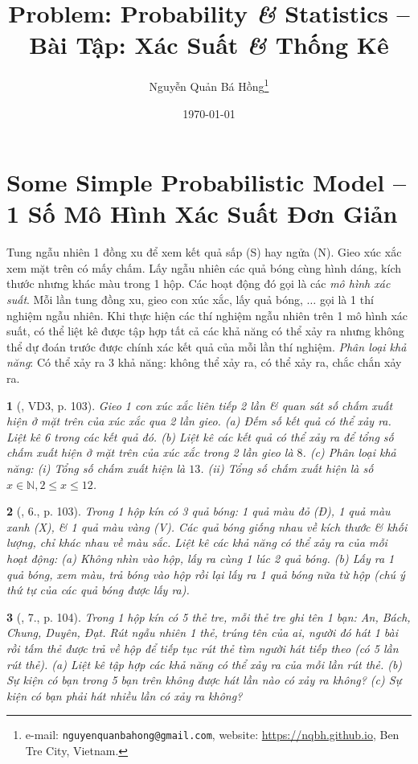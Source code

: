 \documentclass{article}
\title{Problem: Probability {\it\&} Statistics -- Bài Tập: Xác Suất {\it\&} Thống Kê}
\author{Nguyễn Quản Bá Hồng\footnote{e-mail: \texttt{nguyenquanbahong@gmail.com}, website: \url{https://nqbh.github.io}, Ben Tre City, Vietnam.}}
\date{\today}
\newtheorem{baitoan}{}
\begin{document}
\maketitle
\tableofcontents


\section{Some Simple Probabilistic Model -- 1 Số Mô Hình Xác Suất Đơn Giản}
 Tung ngẫu nhiên 1 đồng xu để xem kết quả sấp (S) hay ngửa (N). Gieo xúc xắc xem mặt trên có mấy chấm. Lấy ngẫu nhiên các quả bóng cùng hình dáng, kích thước nhưng khác màu trong 1 hộp. Các hoạt động đó gọi là các \textit{mô hình xác suất}. Mỗi lần tung đồng xu, gieo con xúc xắc, lấy quả bóng, $\ldots$ gọi là 1 thí nghiệm ngẫu nhiên.  Khi thực hiện các thí nghiệm ngẫu nhiên trên 1 mô hình xác suất, có thể liệt kê được tập hợp tất cả các khả năng có thể xảy ra nhưng không thể dự đoán trước được chính xác kết quả của mỗi lần thí nghiệm. \textit{Phân loại khả năng}: Có thể xảy ra 3 khả năng: không thể xảy ra, có thể xảy ra, chắc chắn xảy ra.

\begin{baitoan}[\cite{Tuyen_Toan_6}, VD3, p. 103]
	Gieo 1 con xúc xắc liên tiếp 2 lần \& quan sát số chấm xuất hiện ở mặt trên của xúc xắc qua 2 lần gieo. (a) Đếm số kết quả có thể xảy ra. Liệt kê 6 trong các kết quả đó. (b) Liệt kê các kết quả có thể xảy ra để tổng số chấm xuất hiện ở mặt trên của xúc xắc trong 2 lần gieo là $8$. (c) Phân loại khả năng: (i) Tổng số chấm xuất hiện là $13$. (ii) Tổng số chấm xuất hiện là số $x\in\mathbb{N},2\le x\le12$.
\end{baitoan}

\begin{baitoan}[\cite{Tuyen_Toan_6}, 6., p. 103]
	Trong 1 hộp kín có 3 quả bóng: 1 quả màu đỏ (Đ), 1 quả màu xanh (X), \& 1 quả màu vàng (V). Các quả bóng giống nhau về kích thước \& khối lượng, chỉ khác nhau về màu sắc. Liệt kê các khả năng có thể xảy ra của mỗi hoạt động: (a) Không nhìn vào hộp, lấy ra cùng 1 lúc 2 quả bóng. (b) Lấy ra 1 quả bóng, xem màu, trả bóng vào hộp rồi lại lấy ra 1 quả bóng nữa từ hộp (chú ý thứ tự của các quả bóng được lấy ra).
\end{baitoan}

\begin{baitoan}[\cite{Tuyen_Toan_6}, 7., p. 104]
	Trong 1 hộp kín có 5 thẻ tre, mỗi thẻ tre ghi tên 1 bạn: An, Bách, Chung, Duyên, Đạt. Rút ngẫu nhiên 1 thẻ, trúng tên của ai, người đó hát 1 bài rồi tấm thẻ được trả về hộp để tiếp tục rút thẻ tìm người hát tiếp theo (có 5 lần rút thẻ). (a) Liệt kê tập hợp các khả năng có thể xảy ra của mỗi lần rút thẻ. (b) Sự kiện có bạn trong 5 bạn trên không được hát lần nào có xảy ra không? (c) Sự kiện có bạn phải hát nhiều lần có xảy ra không?
\end{baitoan}
\end{document}
